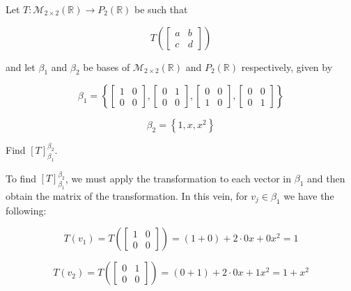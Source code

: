 \documentclass{report}
\begin{document}
    \begin{Example}
            Let $T: \mathcal{M}_{2 \times 2}(\mathbb{R}) \to P_2(\mathbb{R})$ be such that

        $$T\left(\begin{bmatrix}
            a & b \\
            c & d
        \end{bmatrix}\right)$$

        and let $\beta_1$ and $\beta_2$ be bases of $\mathcal{M}_{2 \times 2}(\mathbb{R})$ and $P_2(\mathbb{R})$ respectively, given by

        $$\beta_1 = \left\{
            \begin{bmatrix}
                1 & 0 \\
                0 & 0
            \end{bmatrix},
            \begin{bmatrix}
                0 & 1 \\
                0 & 0
            \end{bmatrix},
            \begin{bmatrix}
                0 & 0 \\
                1 & 0
            \end{bmatrix},
            \begin{bmatrix}
                0 & 0 \\
                0 & 1
            \end{bmatrix}
        \right\}$$

        $$\beta_2 = \left\{1, x, x^2\right\}$$

        Find $[T]_{\beta_1}^{\beta_2}$.

        To find $[T]_{\beta_1}^{\beta_2}$, we must apply the transformation to each vector in $\beta_1$ and then obtain the matrix of the transformation. In this vein, for $v_j \in \beta_1$ we have the following:

        $$T(v_1) = T \left(\begin{bmatrix}
            1 & 0 \\
            0 & 0
        \end{bmatrix}\right) = (1 + 0) + 2 \cdot 0x + 0x^2 = 1$$

        $$T(v_2) = T \left(\begin{bmatrix}
            0 & 1 \\
            0 & 0
        \end{bmatrix}\right) = (0 + 1) + 2 \cdot 0x + 1x^2 = 1 + x^2$$


\end{Example}
\end{document}

